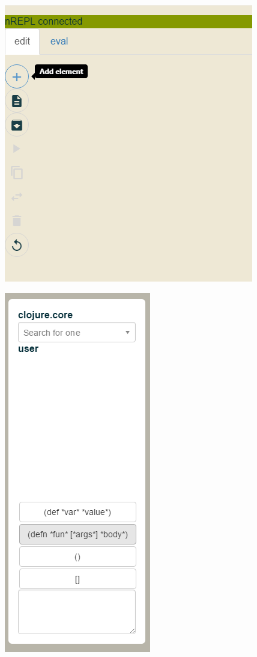 \documentclass[english,mgr,shortabstract]{iithesis}
\begin{document}
\begin{figure}
  \centering
  \begin{minipage}{0.48\textwidth}
    \centering
    \includegraphics[scale=0.3]{img/j-add}
\label{fig:j-add}
  \end{minipage}
  \begin{minipage}{0.48\textwidth}
    \centering
    \includegraphics[scale=0.3]{img/j-add_box}
\label{fig:j-add_box}
  \end{minipage}
\end{figure}
\end{document}
